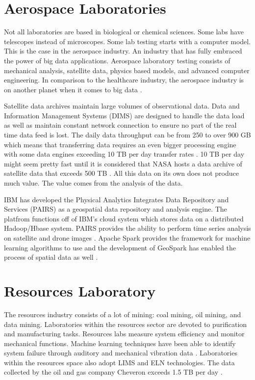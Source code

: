 \documentclass[sigconf]{acmart}
\begin{document}
\section{Aerospace Laboratories}
Not all laboratories are based in biological or chemical sciences. Some labs have telescopes instead of microscopes. Some lab testing starts with a computer model. This is the case in the aerospace industry. An industry that has fully embraced the power of big data applications. Aerospace laboratory testing consists of mechanical analysis, satellite data, physics based models, and advanced computer engineering. In comparison to the healthcare industry, the aerospace industry is on another planet when it comes to big data \cite{Evan}. 

Satellite data archives maintain large volumes of observational data. Data and Information Management Systems (DIMS) are designed to handle the data load as well as maintain constant network connection to ensure no part of the real time data feed is lost. The daily data throughput can be from 250 to over 900 GB which means that transferring data requires an even bigger processing engine with some data engines exceeding 10 TB per day transfer rates \cite{Kiemle}. 10 TB per day might seem pretty fast until it is considered that NASA hosts a data archive of satellite data that exceeds 500 TB \cite{Lenka}.  All this data on its own does not produce much value. The value comes from the analysis of the data. 

IBM has developed the Physical Analytics Integrates Data Repository and Services (PAIRS) as a geospatial data repository and analysis engine. The platfrom functions off of IBM's cloud system which stores data on a distributed Hadoop/Hbase system. PAIRS provides the ability to perform time series analysis on satellite and drone images \cite{Lu}. Apache Spark provides the framework for machine learning algorithms to use and the development of GeoSpark has enabled the process of spatial data as well \cite{Lenka}. 

\section{Resources Laboratory}
The resources industry consists of a lot of mining: coal mining, oil mining, and data mining. Laboratories within the resources sector are devoted to purification and manufacturing tasks. Resources labs measure system efficiency and monitor mechanical functions. Machine learning techniques have been able to identify system failure through auditory and mechanical vibration data \cite{Lei}. Laboratories within the resources space also adopt LIMS and ELN technologies. The data collected by the oil and gas company Cheveron exceeds 1.5 TB per day \cite{Alguliyev}.
\end{document}
